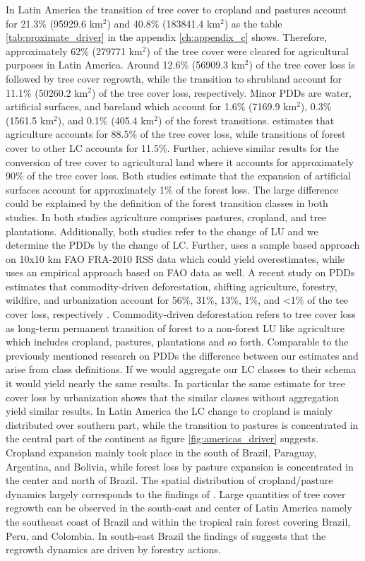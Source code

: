 			In Latin America the transition of tree cover to cropland and pastures account for 21.3\% (95929.6 km$^2$) and 40.8\% (183841.4 km$^2$) as the table \ref{tab:proximate_driver} in the appendix \ref{ch:appendix_c} shows. Therefore, approximately 62\% (279771 km$^2$) of the tree cover were cleared for agricultural purposes in Latin America. Around 12.6\% (56909.3 km$^2$) of the tree cover loss is followed by tree cover regrowth, while the transition to shrubland account for 11.1\% (50260.2 km$^2$) of the tree cover loss, respectively. Minor \acp{PDD} are water, artificial surfaces, and bareland which account for 1.6\% (7169.9 km$^2$), 0.3\% (1561.5 km$^2$), and 0.1\% (405.4 km$^2$) of the forest transitions. \citeauthor{Sy2015} estimates that agriculture accounts for 88.5\% of the tree cover loss, while transitions of forest cover to other \ac{LC} accounts for 11.5\%. Further, \citeauthor{Hosonuma2012} achieve similar results for the conversion of tree cover to agricultural land where it accounts for approximately 90\% of the tree cover loss. Both studies estimate that the expansion of artificial surfaces account for approximately 1\% of the forest loss. The large difference could be explained by the definition of the forest transition classes in both studies. In both studies agriculture comprises pastures, cropland, and tree plantations. Additionally, both studies refer to the change of \ac{LU} and we determine the \acp{PDD} by the change of \ac{LC}. Further, \citeauthor{Sy2015} uses a sample based approach on 10x10 km \ac{FAO} FRA-2010 RSS data which could yield overestimates, while \citeauthor{Hosonuma2012} uses an empirical approach based on \ac{FAO} data as well. A recent study on \acp{PDD} estimates that commodity-driven deforestation, shifting agriculture, forestry, wildfire, and urbanization account for 56\%, 31\%, 13\%, 1\%, and <1\% of the tee cover loss, respectively \citep{Curtis2018}. Commodity-driven deforestation refers to tree cover loss as long-term permanent transition of forest to a non-forest \ac{LU} like agriculture which includes cropland, pastures, plantations and so forth. Comparable to the previously mentioned research on \acp{PDD} the difference between our estimates and \citeauthor{Curtis2018} arise from class definitions. If we would aggregate our \ac{LC} classes to their schema it would yield nearly the same results. In particular the same estimate for tree cover loss by urbanization shows that the similar classes without aggregation yield similar results. In Latin America the \ac{LC} change to cropland is mainly distributed over southern part, while the transition to pastures is concentrated in the central part of the continent as figure \ref{fig:americas_driver} suggests. Cropland expansion mainly took place in the south of Brazil, Paraguay, Argentina, and Bolivia, while forest loss by pasture expansion is concentrated in the center and north of Brazil. The spatial distribution of cropland/pasture dynamics largely corresponds to the findings of \citeauthor{Graesser2015}. Large quantities of tree cover regrowth can be observed in the south-east and center of Latin America namely the southeast coast of Brazil and within the tropical rain forest covering Brazil, Peru, and Colombia. In south-east Brazil the findings of \citeauthor{Curtis2018} suggests that the regrowth dynamics are driven by forestry actions.
